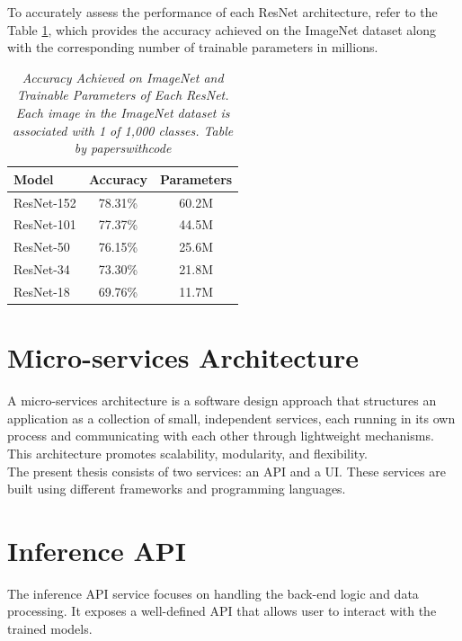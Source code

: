 To accurately assess the performance of each ResNet architecture, refer to the
Table \ref{table:resnet}, which provides the accuracy achieved on the
ImageNet dataset along with the corresponding number of trainable parameters in
millions.

\begin{table}[H]
  \centering
  \begin{tabular}{lcc}
    \toprule
    \textbf{Model} & \textbf{Accuracy} & \textbf{Parameters} \\
    \midrule
    ResNet-152 & 78.31\% & 60.2M \\
    ResNet-101 & 77.37\% & 44.5M \\
    ResNet-50 & 76.15\% & 25.6M \\
    ResNet-34 & 73.30\% & 21.8M \\
    ResNet-18 & 69.76\% & 11.7M \\
    \bottomrule
  \end{tabular}
  \caption[Accuracy Achieved on ImageNet and Trainable Parameters of Each ResNet.]
  {\textit{Accuracy Achieved on ImageNet and Trainable Parameters of Each ResNet.
  Each image in the ImageNet dataset is associated with 1 of 1,000 classes. Table by paperswithcode}}
  {\label{table:resnet}}
\end{table}

\section{Micro-services Architecture}

A micro-services architecture is a software design approach that structures an
application as a collection of small, independent services, each running in its
own process and communicating with each other through lightweight mechanisms.
This architecture promotes scalability, modularity, and flexibility. \\

The present thesis consists of two services: an API and a UI. These services
are built using different frameworks and programming languages.


\section{Inference API}

The inference API service focuses on handling the back-end logic and data
processing. It exposes a well-defined API that allows user to interact with the
trained models. \\


